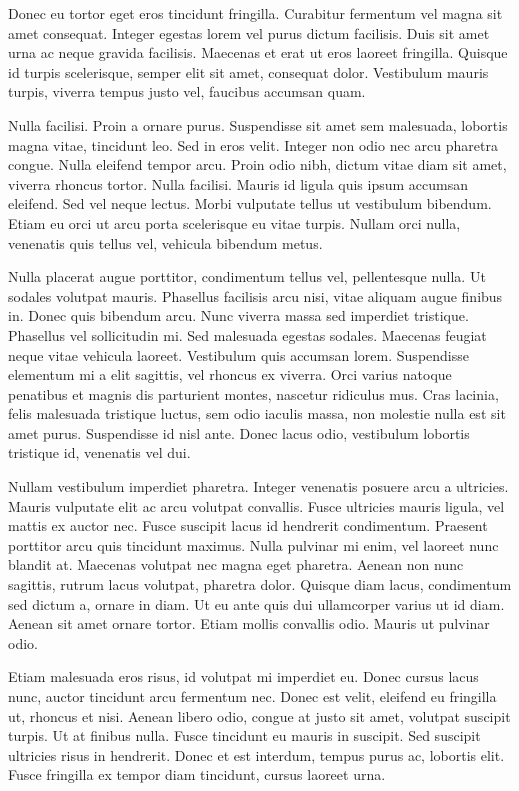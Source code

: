 Donec eu tortor eget eros tincidunt fringilla. Curabitur fermentum vel magna sit amet consequat. Integer egestas lorem vel purus dictum facilisis. Duis sit amet urna ac neque gravida facilisis. Maecenas et erat ut eros laoreet fringilla. Quisque id turpis scelerisque, semper elit sit amet, consequat dolor. Vestibulum mauris turpis, viverra tempus justo vel, faucibus accumsan quam.

Nulla facilisi. Proin a ornare purus. Suspendisse sit amet sem malesuada, lobortis magna vitae, tincidunt leo. Sed in eros velit. Integer non odio nec arcu pharetra congue. Nulla eleifend tempor arcu. Proin odio nibh, dictum vitae diam sit amet, viverra rhoncus tortor. Nulla facilisi. Mauris id ligula quis ipsum accumsan eleifend. Sed vel neque lectus. Morbi vulputate tellus ut vestibulum bibendum. Etiam eu orci ut arcu porta scelerisque eu vitae turpis. Nullam orci nulla, venenatis quis tellus vel, vehicula bibendum metus.

Nulla placerat augue porttitor, condimentum tellus vel, pellentesque nulla. Ut sodales volutpat mauris. Phasellus facilisis arcu nisi, vitae aliquam augue finibus in. Donec quis bibendum arcu. Nunc viverra massa sed imperdiet tristique. Phasellus vel sollicitudin mi. Sed malesuada egestas sodales. Maecenas feugiat neque vitae vehicula laoreet. Vestibulum quis accumsan lorem. Suspendisse elementum mi a elit sagittis, vel rhoncus ex viverra. Orci varius natoque penatibus et magnis dis parturient montes, nascetur ridiculus mus. Cras lacinia, felis malesuada tristique luctus, sem odio iaculis massa, non molestie nulla est sit amet purus. Suspendisse id nisl ante. Donec lacus odio, vestibulum lobortis tristique id, venenatis vel dui.

Nullam vestibulum imperdiet pharetra. Integer venenatis posuere arcu a ultricies. Mauris vulputate elit ac arcu volutpat convallis. Fusce ultricies mauris ligula, vel mattis ex auctor nec. Fusce suscipit lacus id hendrerit condimentum. Praesent porttitor arcu quis tincidunt maximus. Nulla pulvinar mi enim, vel laoreet nunc blandit at. Maecenas volutpat nec magna eget pharetra. Aenean non nunc sagittis, rutrum lacus volutpat, pharetra dolor. Quisque diam lacus, condimentum sed dictum a, ornare in diam. Ut eu ante quis dui ullamcorper varius ut id diam. Aenean sit amet ornare tortor. Etiam mollis convallis odio. Mauris ut pulvinar odio.

Etiam malesuada eros risus, id volutpat mi imperdiet eu. Donec cursus lacus nunc, auctor tincidunt arcu fermentum nec. Donec est velit, eleifend eu fringilla ut, rhoncus et nisi. Aenean libero odio, congue at justo sit amet, volutpat suscipit turpis. Ut at finibus nulla. Fusce tincidunt eu mauris in suscipit. Sed suscipit ultricies risus in hendrerit. Donec et est interdum, tempus purus ac, lobortis elit. Fusce fringilla ex tempor diam tincidunt, cursus laoreet urna.

